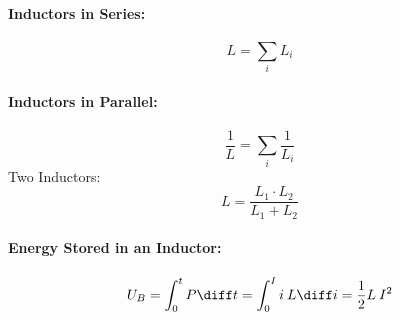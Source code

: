 	\begin{multicols*}{2}
		\paragraph{Inductors in Series:} %
			\[
				L = \sum_i L_i
			\]
			\phantom{Two Inductors:
			\[
				L = \frac{L_1 \cdot L_2}{L_1 + L_2}
			\]}
		\paragraph{Inductors in Parallel:} %
			\[
				\frac{1}{L} = \sum_i \frac{1}{L_i}
			\]
			Two Inductors:
			\[
				L = \frac{L_1 \cdot L_2}{L_1 + L_2}
			\]
	\end{multicols*}
	
	\paragraph{Energy Stored in an Inductor:} %
		\[
			U_B = \int_0^t P \diff t = \int_0^I i \:L \diff i = \frac{1}{2} L\:I^2
		\]
